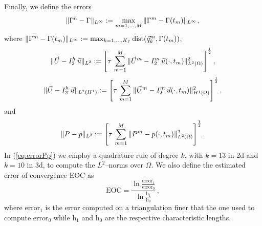 Finally, we define the errors
\begin{equation} \label{eq:errorXx}
\|\Gamma^h - \Gamma\|_{L^\infty} := \max_{m=1,\ldots, M} \|\Gamma^m - \Gamma(t_m)\|_{L^\infty}\,,
\end{equation}
where $\|\Gamma^m - \Gamma(t_m)\|_{L^\infty} :=
\max_{k=1,\ldots, K_\Gamma} {\rm dist}( \vec q^m_k, \Gamma(t_m))$,
\begin{equation} \label{eq:errorLUu}
\|\vec U - I^h_{2}\,\vec u\|_{L^2} := \left[\tau\,\sum_{m=1}^M \|\vec U^m - I^m_2\,\vec u(\cdot,
t_m)\|_{L^2(\Omega)}^2 \right]^\frac12,
\end{equation}
\begin{equation} \label{eq:errorHUu}
\|\vec U - I^h_{2}\,\vec u\|_{L^2(H^1)} := \left[\tau\,\sum_{m=1}^M \|\vec U^m - I^m_2\,\vec u(\cdot,
t_m)\|_{H^1(\Omega)}^2 \right]^\frac12,
\end{equation}
and
\begin{equation} \label{eq:errorPp}
\|P - p\|_{L^2} := \left[\tau\,\sum_{m=1}^M \|P^m - p(\cdot,t_m)\|_{L^2(\Omega)}^2
\right]^\frac12.
\end{equation}
In (\ref{eq:errorPp}) we employ a quadrature rule of degree $k$, with $k=13$ in
2d and $k=10$ in 3d, to compute the $L^2$--norms over $\Omega$. We also define
the estimated error of convergence EOC as
\begin{equation} \label{eq:eoc}
\mbox{EOC}=\frac{\ln{\frac{\mbox{error}_1}{\mbox{error}_0}}}
{\ln{\frac{\mbox{h}_1}{\mbox{h}_0}}}\,,
\end{equation}
where $\mbox{error}_1$ is the error computed on a triangulation finer that the
one used to compute $\mbox{error}_0$ while $\mbox{h}_1$ and $\mbox{h}_0$ are the
respective characteristic lengths.

